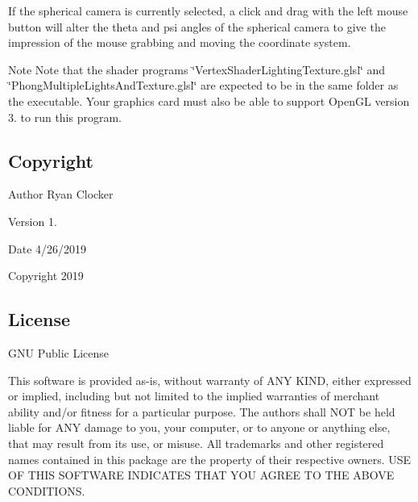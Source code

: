 If the spherical camera is currently selected, a click and drag with the left mouse button will alter the theta and psi angles of the spherical camera to give the impression of the mouse grabbing and moving the coordinate system.

\begin{DoxyNote}{Note}
Note that the shader programs \char`\"{}\+Vertex\+Shader\+Lighting\+Texture.\+glsl\char`\"{} and \char`\"{}\+Phong\+Multiple\+Lights\+And\+Texture.\+glsl\char`\"{} are expected to be in the same folder as the executable. Your graphics card must also be able to support Open\+GL version 3. to run this program.
\end{DoxyNote}


\hypertarget{index_copyright}{}\subsection{Copyright}\label{index_copyright}
\begin{DoxyAuthor}{Author}
Ryan Clocker 
\end{DoxyAuthor}
\begin{DoxyVersion}{Version}
1. 
\end{DoxyVersion}
\begin{DoxyDate}{Date}
4/26/2019 
\end{DoxyDate}
\begin{DoxyCopyright}{Copyright}
2019
\end{DoxyCopyright}


\hypertarget{index_license}{}\subsection{License}\label{index_license}
G\+NU Public License

This software is provided as-\/is, without warranty of A\+NY K\+I\+ND, either expressed or implied, including but not limited to the implied warranties of merchant ability and/or fitness for a particular purpose. The authors shall N\+OT be held liable for A\+NY damage to you, your computer, or to anyone or anything else, that may result from its use, or misuse. All trademarks and other registered names contained in this package are the property of their respective owners. U\+SE OF T\+H\+IS S\+O\+F\+T\+W\+A\+RE I\+N\+D\+I\+C\+A\+T\+ES T\+H\+AT Y\+OU A\+G\+R\+EE TO T\+HE A\+B\+O\+VE C\+O\+N\+D\+I\+T\+I\+O\+NS. 